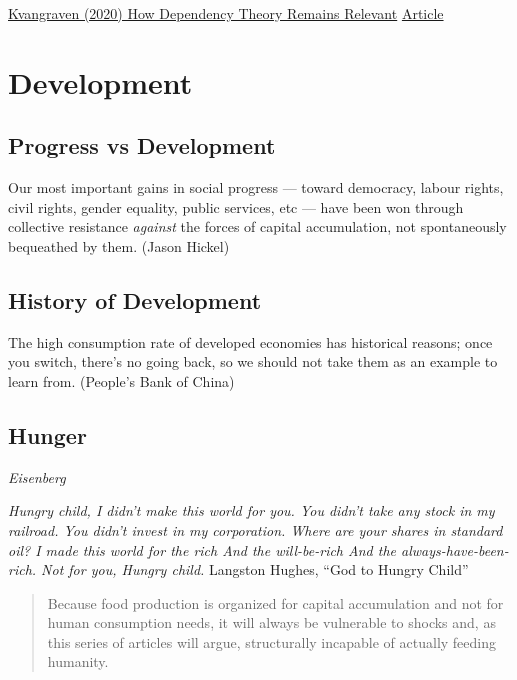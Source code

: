 \documentclass[
]{book}
\begin{document}
\href{https://www.ppesydney.net/beyond-the-stereotype-how-dependency-theory-remains-relevant/}{Kvangraven (2020) How Dependency Theory Remains Relevant}
\href{https://onlinelibrary.wiley.com/doi/full/10.1111/dech.12593}{Article}

\hypertarget{development}{%
\chapter{Development}\label{development}}

\hypertarget{progress-vs-development}{%
\section{Progress vs Development}\label{progress-vs-development}}

Our most important gains in social progress --- toward democracy, labour rights, civil rights, gender equality, public services, etc --- have been won through collective resistance \emph{against} the forces of capital accumulation, not spontaneously bequeathed by them. (Jason Hickel)

\hypertarget{history-of-development}{%
\section{History of Development}\label{history-of-development}}

The high consumption rate of developed economies has historical reasons; once you switch, there's no going back, so we should not take them as an example to learn from. (People's Bank of China)

\hypertarget{hunger}{%
\section{Hunger}\label{hunger}}

\emph{Eisenberg}

\emph{Hungry child,
I didn't make this world for you.
You didn't take any stock in my railroad.
You didn't invest in my corporation.
Where are your shares in standard oil?
I made this world for the rich
And the will-be-rich
And the always-have-been-rich.
Not for you,
Hungry child.}
Langston Hughes, ``God to Hungry Child''

\begin{quote}
Because food production is organized for capital accumulation and not for human consumption needs, it will always be vulnerable to shocks and, as this series of articles will argue, structurally incapable of actually feeding humanity.
\end{quote}
\end{document}
